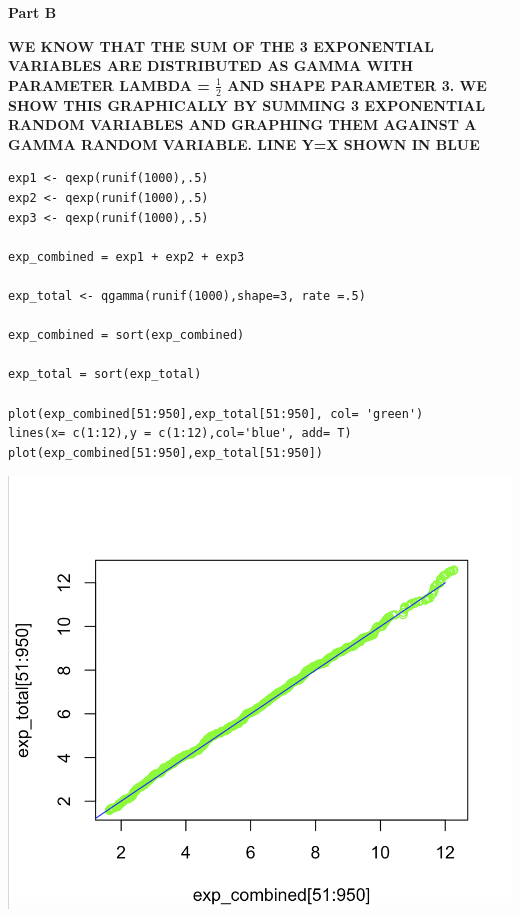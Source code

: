 \documentclass[svgnames]{article}
\begin{document}
\textbf{Part B}

\textbf{WE KNOW THAT THE SUM OF THE 3 EXPONENTIAL VARIABLES ARE DISTRIBUTED AS GAMMA WITH PARAMETER LAMBDA = $\frac{1}{2}$ AND SHAPE PARAMETER 3. WE SHOW THIS GRAPHICALLY BY SUMMING 3 EXPONENTIAL RANDOM VARIABLES AND GRAPHING THEM AGAINST A GAMMA RANDOM VARIABLE. LINE Y=X SHOWN IN BLUE}

\begin{lstlisting}
exp1 <- qexp(runif(1000),.5)
exp2 <- qexp(runif(1000),.5)
exp3 <- qexp(runif(1000),.5)

exp_combined = exp1 + exp2 + exp3

exp_total <- qgamma(runif(1000),shape=3, rate =.5)

exp_combined = sort(exp_combined)

exp_total = sort(exp_total)

plot(exp_combined[51:950],exp_total[51:950], col= 'green')
lines(x= c(1:12),y = c(1:12),col='blue', add= T)
plot(exp_combined[51:950],exp_total[51:950])
\end{lstlisting}
\includegraphics[scale=.65]{Exponentialsum}
\end{document}
